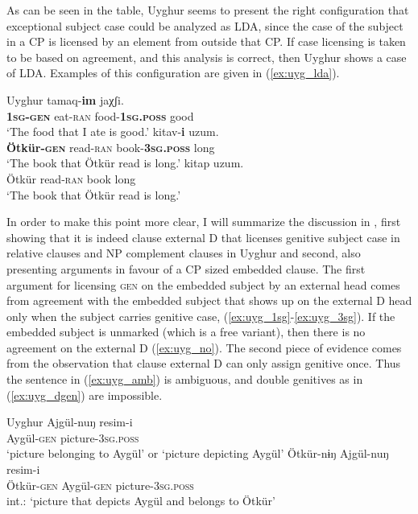 \documentclass[output=paper
,modfonts
,nonflat]{langsci/langscibook}
\begin{document}
As can be seen in the table, Uyghur seems to present the right configuration that exceptional subject case could be analyzed as LDA, since the case of the subject in a CP is licensed by an element from outside that CP. If case licensing is taken to be based on agreement, and this analysis is correct, then Uyghur shows a case of LDA. Examples of this configuration are given in (\ref{ex:uyg_lda}).
\begin{exe}
\ex Uyghur \citep[][4]{Asarina_Hartman2011b}\label{ex:uyg_lda}
	\xlist
	\ex 
		 tamaq-\textbf{im} jaχʃi.\\
		 	 {} \textbf{\textsc{1sg}-\textsc{gen}} eat-\textsc{ran} {} food-\textbf{1\textsc{sg.poss}} good\\
		\glt `The food that I ate is good.'\label{ex:uyg_1sg}
	\ex
		 kitav-\textbf{i} uzum.\\
			 {} \textbf{Ötkür-\textsc{gen}} read-\textsc{ran} {} book-\textbf{3\textsc{sg.poss}} long\\
		\glt `The book that Ötkür read is long.'\label{ex:uyg_3sg}
	\ex
		 kitap uzum.\\
			 {} Ötkür read-\textsc{ran} {} book long\\
		\glt `The book that Ötkür read is long.'\label{ex:uyg_no}
	\endxlist
\end{exe}
In order to make this point more clear, I will summarize the discussion in \citet{Asarina_Hartman2011a}, first showing that it is indeed clause external D that licenses genitive subject case in relative clauses and NP complement clauses in Uyghur and second, also presenting arguments in favour of a CP sized embedded clause. The first argument for licensing \textsc{gen} on the embedded subject by an external head comes from agreement with the embedded subject that shows up on the external D head only when the subject carries genitive case, (\ref{ex:uyg_1sg}-\ref{ex:uyg_3sg}). If the embedded subject is unmarked (which is a free variant), then there is no agreement on the external D (\ref{ex:uyg_no}). The second piece of evidence comes from the observation that clause external D can only assign genitive once. Thus the sentence in (\ref{ex:uyg_amb}) is ambiguous, and double genitives as in (\ref{ex:uyg_dgen}) are impossible.
\begin{exe}
\ex Uyghur \citep[][3]{Asarina_Hartman2011a}
	\xlist
	\ex \label{ex:uyg_amb}
		\gll Ajgül-nuŋ resim-i\\
			 Aygül-\textsc{gen} picture-3\textsc{sg.poss}\\
		\glt `picture belonging to Aygül' or `picture depicting Aygül'
	\ex \label{ex:uyg_dgen}
		\gll *Ötkür-nɨŋ Ajgül-nuŋ resim-i\\
			 Ötkür-\textsc{gen} Aygül-\textsc{gen} picture-3\textsc{sg.poss}\\
		\glt int.: `picture that depicts Aygül and belongs to Ötkür'
	\endxlist
\end{exe}
\end{document}
